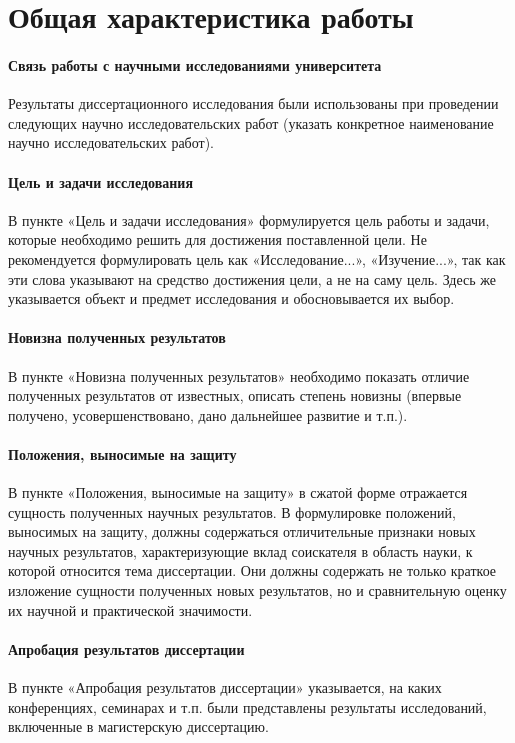 \section{Общая характеристика работы}

\paragraph{Связь работы с научными исследованиями университета}
Результаты диссертационного исследования были использованы при
проведении следующих научно исследовательских работ (указать
конкретное наименование научно исследовательских работ).

\paragraph{Цель и задачи исследования}
В пункте «Цель и задачи исследования» формулируется цель работы и задачи,
которые необходимо решить для достижения поставленной цели.
Не рекомендуется формулировать цель как
«Исследование...», «Изучение...», так как эти слова указывают на средство
достижения цели, а не на саму цель. Здесь же указывается объект и
предмет исследования и обосновывается их выбор.

\paragraph{Новизна полученных результатов}
В пункте «Новизна полученных результатов» необходимо показать отличие полученных
результатов от
известных,
описать
степень
новизны
(впервые
получено,
усовершенствовано, дано дальнейшее развитие и т.п.).

\paragraph{Положения, выносимые на защиту}
В пункте «Положения,
выносимые на защиту» в сжатой форме отражается сущность полученных
научных результатов. В формулировке положений, выносимых на защиту,
должны содержаться отличительные признаки новых научных
результатов, характеризующие вклад соискателя в область науки, к
которой относится тема диссертации. Они должны содержать не только
краткое изложение сущности полученных новых результатов, но и
сравнительную оценку их научной и практической значимости.

\paragraph{Апробация результатов диссертации} В пункте «Апробация
результатов диссертации» указывается, на каких конференциях, семинарах
и т.п. были представлены результаты исследований, включенные в
магистерскую диссертацию.

